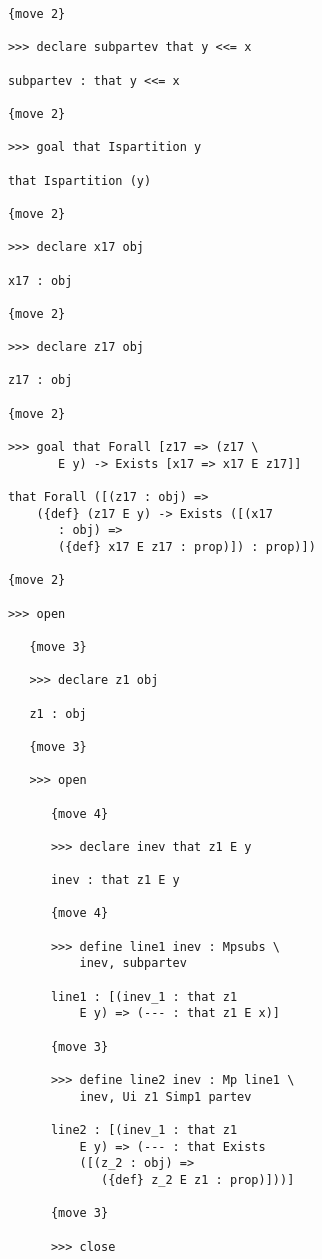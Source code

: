 \documentclass[12pt]{article}
\begin{document}
\begin{verbatim}
      {move 2}

      >>> declare subpartev that y <<= x

      subpartev : that y <<= x

      {move 2}

      >>> goal that Ispartition y

      that Ispartition (y)

      {move 2}

      >>> declare x17 obj

      x17 : obj

      {move 2}

      >>> declare z17 obj

      z17 : obj

      {move 2}

      >>> goal that Forall [z17 => (z17 \
             E y) -> Exists [x17 => x17 E z17]]

      that Forall ([(z17 : obj) => 
          ({def} (z17 E y) -> Exists ([(x17 
             : obj) => 
             ({def} x17 E z17 : prop)]) : prop)])

      {move 2}

      >>> open

         {move 3}

         >>> declare z1 obj

         z1 : obj

         {move 3}

         >>> open

            {move 4}

            >>> declare inev that z1 E y

            inev : that z1 E y

            {move 4}

            >>> define line1 inev : Mpsubs \
                inev, subpartev

            line1 : [(inev_1 : that z1 
                E y) => (--- : that z1 E x)]

            {move 3}

            >>> define line2 inev : Mp line1 \
                inev, Ui z1 Simp1 partev

            line2 : [(inev_1 : that z1 
                E y) => (--- : that Exists 
                ([(z_2 : obj) => 
                   ({def} z_2 E z1 : prop)]))]

            {move 3}

            >>> close


\end{verbatim}
\end{document}

